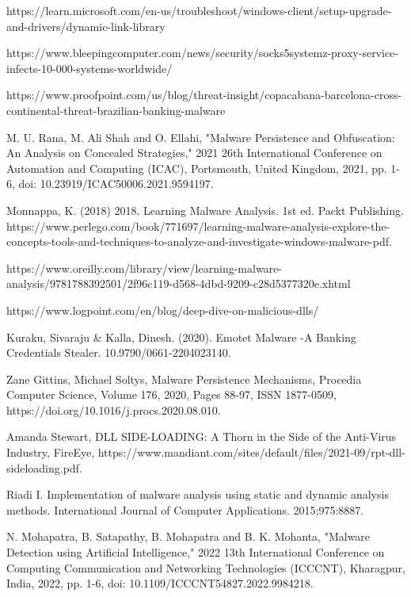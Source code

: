 \documentclass{article}
\begin{document}
\clearpage
\begin{thebibliography}{9}
https://learn.microsoft.com/en-us/troubleshoot/windows-client/setup-upgrade-and-drivers/dynamic-link-library 

https://www.bleepingcomputer.com/news/security/socks5systemz-proxy-service-infects-10-000-systems-worldwide/ 

https://www.proofpoint.com/us/blog/threat-insight/copacabana-barcelona-cross-continental-threat-brazilian-banking-malware 

M. U. Rana, M. Ali Shah and O. Ellahi, "Malware Persistence and Obfuscation: An Analysis on Concealed Strategies," 2021 26th International Conference on Automation and Computing (ICAC), Portsmouth, United Kingdom, 2021, pp. 1-6, doi: 10.23919/ICAC50006.2021.9594197.

Monnappa, K. (2018) 2018. Learning Malware Analysis. 1st ed. Packt Publishing. https://www.perlego.com/book/771697/learning-malware-analysis-explore-the-concepts-tools-and-techniques-to-analyze-and-investigate-windows-malware-pdf.

https://www.oreilly.com/library/view/learning-malware-analysis/9781788392501/2f96c119-d568-4dbd-9209-c28d5377320e.xhtml 

https://www.logpoint.com/en/blog/deep-dive-on-malicious-dlls/

Kuraku, Sivaraju \& Kalla, Dinesh. (2020). Emotet Malware -A Banking Credentials Stealer. 10.9790/0661-2204023140.

Zane Gittins, Michael Soltys, Malware Persistence Mechanisms, Procedia Computer Science, Volume 176, 2020, Pages 88-97, ISSN 1877-0509, https://doi.org/10.1016/j.procs.2020.08.010.

Amanda Stewart, DLL SIDE-LOADING: A Thorn in the Side of the Anti-Virus Industry, FireEye, https://www.mandiant.com/sites/default/files/2021-09/rpt-dll-sideloading.pdf.

Riadi I. Implementation of malware analysis using static and dynamic analysis methods. International Journal of Computer Applications. 2015;975:8887.

N. Mohapatra, B. Satapathy, B. Mohapatra and B. K. Mohanta, "Malware Detection using Artificial Intelligence," 2022 13th International Conference on Computing Communication and Networking Technologies (ICCCNT), Kharagpur, India, 2022, pp. 1-6, doi: 10.1109/ICCCNT54827.2022.9984218.


\end{thebibliography}
\end{document}
